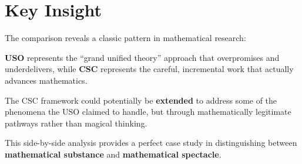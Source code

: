 \documentclass[10pt]{article}
\begin{document}
\section*{Key Insight}

The comparison reveals a classic pattern in mathematical research:

\textbf{USO} represents the ``grand unified theory'' approach that overpromises and underdelivers, while \textbf{CSC} represents the careful, incremental work that actually advances mathematics.

The CSC framework could potentially be \textbf{extended} to address some of the phenomena the USO claimed to handle, but through mathematically legitimate pathways rather than magical thinking.

This side-by-side analysis provides a perfect case study in distinguishing between \textbf{mathematical substance} and \textbf{mathematical spectacle}.
\end{document}
